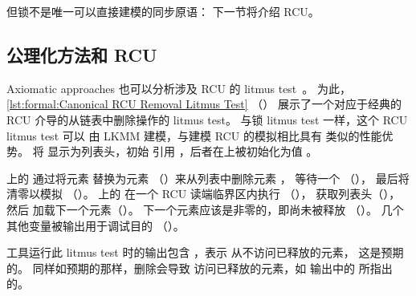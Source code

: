 但锁不是唯一可以直接建模的同步原语：
下一节将介绍 RCU\@。

\subsection{公理化方法和 RCU}
\label{sec:formal:Axiomatic Approaches and RCU}

\begin{fcvref}
Axiomatic approaches 也可以分析涉及
RCU 的 litmus test~\cite{Alglave:2018:FSC:3173162.3177156}。
为此，\cref{lst:formal:Canonical RCU Removal Litmus Test}
（）
展示了一个对应于经典的 RCU 介导的从链表中删除操作的
litmus test。
与锁 litmus test 一样，这个 RCU litmus test 可以
由 LKMM 建模，与建模 RCU 的模拟相比具有
类似的性能优势。
将  显示为列表头，初始
引用 ，后者在上被初始化为值 。

\begin{listing}

\caption{经典 RCU 删除 Litmus Test}
\label{lst:formal:Canonical RCU Removal Litmus Test}
\end{listing}

上的 
通过将元素  替换为元素 
（）来从列表中删除元素 ，
等待一个 （），
最后将  清零以模拟 （）。
上的 
在一个 RCU 读端临界区内执行
（），
获取列表头（），然后
加载下一个元素（）。
下一个元素应该是非零的，即尚未被释放
（）。
几个其他变量被输出用于调试目的
（）。

 工具运行此 litmus test 时的输出包含
，表示  从不访问已释放的元素，
这是预期的。
同样如预期的那样，删除会导致 
访问已释放的元素，如  输出中的 
所指出的。
\end{fcvref}

\begin{listing}
\caption{复杂的 RCU Litmus Test}
\label{lst:formal:Complex RCU Litmus Test}
\end{listing}

